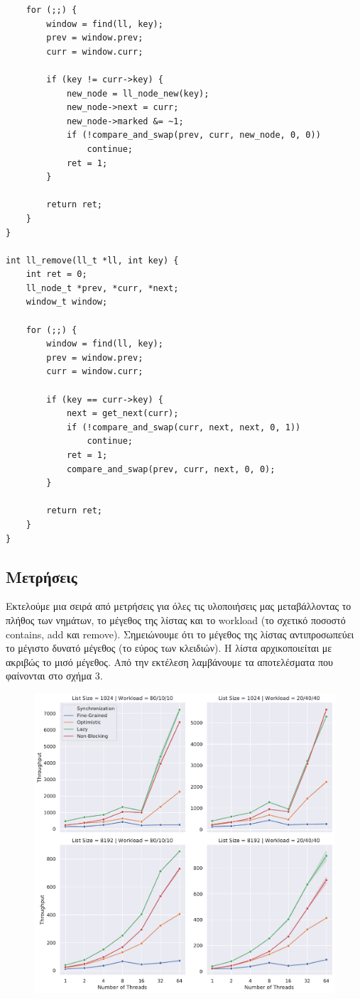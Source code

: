 \documentclass[12pt,titlepage]{article}
\begin{document}
\begin{verbatim}
    for (;;) {
        window = find(ll, key);
        prev = window.prev;
        curr = window.curr;

        if (key != curr->key) {
            new_node = ll_node_new(key);
            new_node->next = curr;
            new_node->marked &= ~1;
            if (!compare_and_swap(prev, curr, new_node, 0, 0))
                continue;
            ret = 1;
        }

        return ret;
    }
}

int ll_remove(ll_t *ll, int key) {
    int ret = 0;
    ll_node_t *prev, *curr, *next;
    window_t window;

    for (;;) {
        window = find(ll, key);
        prev = window.prev;
        curr = window.curr;

        if (key == curr->key) {
            next = get_next(curr);
            if (!compare_and_swap(curr, next, next, 0, 1))
                continue;
            ret = 1;
            compare_and_swap(prev, curr, next, 0, 0);
        }

        return ret;
    }
}
\end{verbatim}

\subsection{Μετρήσεις}

Εκτελούμε μια σειρά από μετρήσεις για όλες τις υλοποιήσεις μας μεταβάλλοντας το
πλήθος των νημάτων, το μέγεθος της λίστας και το workload (το σχετικό ποσοστό
contains, add και remove). Σημειώνουμε ότι το μέγεθος της λίστας αντιπροσωπεύει
το μέγιστο δυνατό μέγεθος (το εύρος των κλειδιών). Η λίστα αρχικοποιείται με
ακριβώς το μισό μέγεθος. Από την εκτέλεση λαμβάνουμε τα αποτελέσματα που
φαίνονται στο σχήμα 3.

\begin{figure}[h!]
    \includegraphics[width=\textwidth]{z3.pdf}
    \caption{}
\end{figure}
\end{document}
